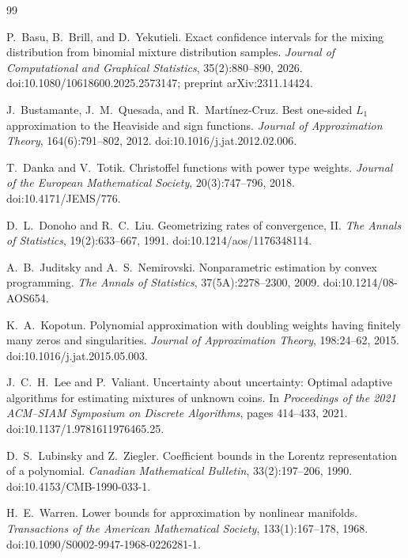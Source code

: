 \documentclass[11pt]{article}
\begin{document}
\begin{thebibliography}{99}

P.~Basu, B.~Brill, and D.~Yekutieli.
\newblock Exact confidence intervals for the mixing distribution from binomial mixture distribution samples.
\newblock \emph{Journal of Computational and Graphical Statistics}, 35(2):880--890, 2026.
\newblock doi:10.1080/10618600.2025.2573147; preprint arXiv:2311.14424.

J.~Bustamante, J.~M.~Quesada, and R.~Mart\'inez-Cruz.
\newblock Best one-sided $L_1$ approximation to the Heaviside and sign functions.
\newblock \emph{Journal of Approximation Theory}, 164(6):791--802, 2012.
\newblock doi:10.1016/j.jat.2012.02.006.

T.~Danka and V.~Totik.
\newblock Christoffel functions with power type weights.
\newblock \emph{Journal of the European Mathematical Society}, 20(3):747--796, 2018.
\newblock doi:10.4171/JEMS/776.

D.~L.~Donoho and R.~C.~Liu.
\newblock Geometrizing rates of convergence, II.
\newblock \emph{The Annals of Statistics}, 19(2):633--667, 1991.
\newblock doi:10.1214/aos/1176348114.

A.~B.~Juditsky and A.~S.~Nemirovski.
\newblock Nonparametric estimation by convex programming.
\newblock \emph{The Annals of Statistics}, 37(5A):2278--2300, 2009.
\newblock doi:10.1214/08-AOS654.

K.~A.~Kopotun.
\newblock Polynomial approximation with doubling weights having finitely many zeros and singularities.
\newblock \emph{Journal of Approximation Theory}, 198:24--62, 2015.
\newblock doi:10.1016/j.jat.2015.05.003.

J.~C.~H.~Lee and P.~Valiant.
\newblock Uncertainty about uncertainty: Optimal adaptive algorithms for estimating mixtures of unknown coins.
\newblock In \emph{Proceedings of the 2021 ACM--SIAM Symposium on Discrete Algorithms}, pages 414--433, 2021.
\newblock doi:10.1137/1.9781611976465.25.

D.~S.~Lubinsky and Z.~Ziegler.
\newblock Coefficient bounds in the Lorentz representation of a polynomial.
\newblock \emph{Canadian Mathematical Bulletin}, 33(2):197--206, 1990.
\newblock doi:10.4153/CMB-1990-033-1.

H.~E.~Warren.
\newblock Lower bounds for approximation by nonlinear manifolds.
\newblock \emph{Transactions of the American Mathematical Society}, 133(1):167--178, 1968.
\newblock doi:10.1090/S0002-9947-1968-0226281-1.

\end{thebibliography}
\end{document}
